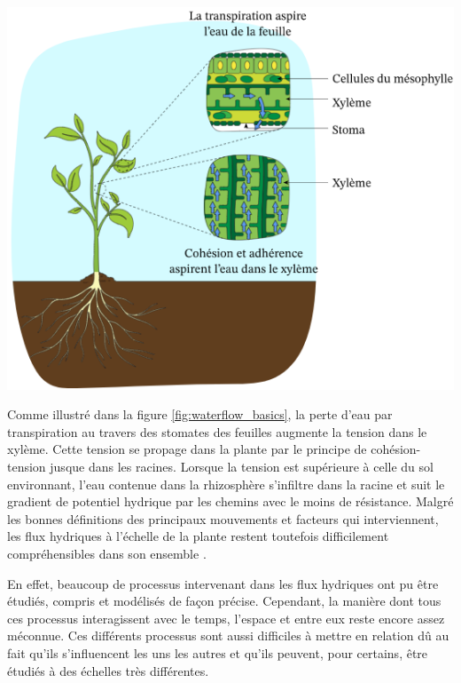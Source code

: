 \begin{minipage}{0.5\linewidth}
\captionsetup{type=figure,hypcap=true}
\centering
\includegraphics[width=\linewidth]{Image/waterflow_basics.png}
\label{fig:waterflow_basics}
\end{minipage}\hfill
\begin{minipage}{0.45\linewidth}
Comme illustré dans la figure \ref{fig:waterflow_basics}, la perte d'eau par transpiration au travers des stomates des feuilles augmente la tension dans le xylème. Cette tension se propage dans la plante par le principe de cohésion-tension jusque dans les racines.
Lorsque la tension est supérieure à celle du sol environnant, l'eau contenue dans la rhizosphère s'infiltre dans la racine et suit le gradient de potentiel hydrique par les chemins avec le moins de résistance.
Malgré les bonnes définitions des principaux mouvements et facteurs qui interviennent, les flux hydriques à l'échelle de la plante restent toutefois difficilement compréhensibles dans son ensemble \citep{lobet_plant_2014}.
\end{minipage} 
\newline

\noindent En effet, beaucoup de processus intervenant dans les flux hydriques ont pu être étudiés, compris et modélisés de façon précise.
Cependant, la manière dont tous ces processus interagissent avec le temps, l'espace et entre eux reste encore assez méconnue.
Ces différents processus sont aussi difficiles à mettre en relation dû au fait qu'ils s'influencent les uns les autres et qu'ils peuvent, pour certains, être étudiés à des échelles très différentes.
\newline

